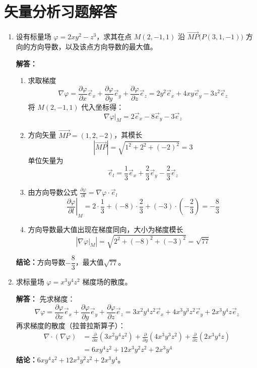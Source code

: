 \section{矢量分析习题解答}

\begin{enumerate}[label=\arabic*.,itemsep=10pt,topsep=5pt,parsep=2pt]

\item 设有标量场 $\varphi = 2xy^2 - z^3$，求其在点 $M(2,-1,1)$ 沿 $\overrightarrow{MP}\big(P(3,1,-1)\big)$ 方向的方向导数，以及该点方向导数的最大值。

\textbf{解答：}
\begin{enumerate}[label=(\arabic*),itemsep=5pt,topsep=2pt,parsep=2pt]
\item 求取梯度
\[
\nabla\varphi = \frac{\partial \varphi}{\partial x}\vec{e}_x+\frac{\partial \varphi}{\partial y}\vec{e}_y+\frac{\partial \varphi}{\partial z}\vec{e}_z
= 2y^2\vec{e}_x + 4xy\vec{e}_y - 3z^2\vec{e}_z
\]
将 $M(2,-1,1)$ 代入坐标得：
\[
\nabla\varphi\big|_M = 2\vec{e}_x - 8\vec{e}_y - 3\vec{e}_z
\]

\item 方向矢量 $\overrightarrow{MP}=(1,2,-2)$，其模长
\[
|\overrightarrow{MP}|=\sqrt{1^2+2^2+(-2)^2}=3
\]
单位矢量为
\[
\vec{e}_l = \frac{1}{3}\vec{e}_x + \frac{2}{3}\vec{e}_y - \frac{2}{3}\vec{e}_z
\]

\item 由方向导数公式 $\displaystyle\frac{\partial \varphi}{\partial l}=\nabla\varphi\cdot\vec{e}_l$
\[
\left.\frac{\partial\varphi}{\partial l}\right|_M
=2\cdot\frac13+(-8)\cdot\frac23+(-3)\cdot\left(-\frac23\right)
=-\frac{8}{3}
\]

\item 方向导数最大值出现在梯度同向，大小为梯度模长
\[
\left|\nabla\varphi\big|_M\right|
=\sqrt{2^2+(-8)^2+(-3)^2}
=\sqrt{77}
\]
\end{enumerate}
\textbf{结论：}方向导数$\boxed{-\dfrac{8}{3}}$，最大值$\boxed{\sqrt{77}}$。

\item 求标量场 $\varphi = x^3y^4z^2$ 梯度场的散度。

\textbf{解答：}
先求梯度：
\[
\nabla\varphi 
=\frac{\partial\varphi}{\partial x}\vec{e}_x+\frac{\partial\varphi}{\partial y}\vec{e}_y+\frac{\partial\varphi}{\partial z}\vec{e}_z
= 3x^2y^4z^2\vec{e}_x + 4x^3y^3z^2\vec{e}_y + 2x^3y^4z\vec{e}_z
\]
再求梯度的散度（拉普拉斯算子）：
\[
\begin{aligned}
\nabla\cdot(\nabla\varphi)
&=\frac{\partial}{\partial x}(3x^2y^4z^2)+\frac{\partial}{\partial y}(4x^3y^3z^2)+\frac{\partial}{\partial z}(2x^3y^4z) \\
&= 6xy^4z^2 + 12x^3y^2z^2 + 2x^3y^4
\end{aligned}
\]
\textbf{结论：}$\boxed{6xy^4z^2 + 12x^3y^2z^2 + 2x^3y^4}$。


\end{enumerate}
